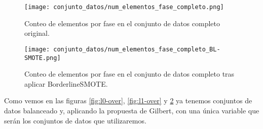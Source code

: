 \begin{figure}[H]
    \centering
	  \texttt{[image: conjunto\_datos/num\_elementos\_fase\_completo.png]}
     \label{fig:completo-orig}
    \caption{Conteo de elementos por fase en el conjunto de datos completo original.}

\end{figure}

\begin{figure}[H]
    \centering
     \texttt{[image: conjunto\_datos/num\_elementos\_fase\_completo\_BL-SMOTE.png]}
    \caption{Conteo de elementos por fase en el conjunto de datos completo tras aplicar BorderlineSMOTE.}
	 \label{fig:completo-over}
\end{figure}


Como vemos en las figuras \ref{fig:l0-over}, \ref{fig:l1-over} y \ref{fig:completo-over} ya tenemos conjuntos de datos balanceado y, aplicando la propuesta de Gilbert, con una única variable que serán los conjuntos de datos que utilizaremos.
